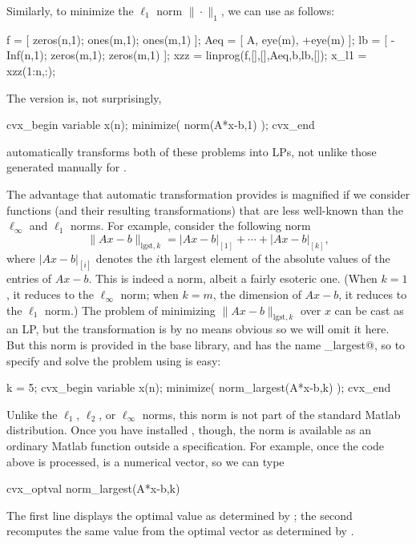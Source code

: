 \documentclass[12pt]{article}
\begin{document}
Similarly, to minimize the $\ell_1$ norm $\|\cdot\|_1$, we can
use \verb@linprog@ as follows:
\begin{code2}[firstnumber=139]
	f    = [ zeros(n,1); ones(m,1);  ones(m,1)  ];
	Aeq  = [ A,          eye(m),     +eye(m)    ];
	lb   = [ -Inf(n,1);  zeros(m,1); zeros(m,1) ];
	xzz  = linprog(f,[],[],Aeq,b,lb,[]);
	x_l1 = xzz(1:n,:);
\end{code2}
The \cvx version is, not surprisingly,
\begin{code2}[firstnumber=149]
	cvx_begin
	    variable x(n);
	    minimize( norm(A*x-b,1) );
	cvx_end
\end{code2}
\cvx automatically transforms both of these problems into LPs, not unlike
those generated manually for \verb@linprog@.

The advantage that automatic transformation provides
is magnified if we consider
functions (and their resulting transformations) that are less well-known than 
the $\ell_\infty$ and $\ell_1$ norms. For example, consider
the following norm
\[
\| Ax-b\|_{\mathrm{lgst},k} = |Ax-b|_{[1]}+ \cdots + |Ax-b|_{[k]},
\]
where $|Ax-b|_{[i]}$ denotes the $i$th largest element of the absolute
values of the entries of $Ax-b$.
This is indeed a norm, albeit a fairly esoteric one.
(When $k=1$, it reduces to the $\ell_\infty$ norm;
when $k=m$, the dimension of $Ax-b$, it reduces to the $\ell_1$ norm.)
The problem of minimizing $\| Ax-b\|_{\mathrm{lgst},k}$ over $x$
can be cast as an LP, but the transformation is by no means obvious
so we will omit it here.
But this norm is provided in the base \cvx library, and has the name
\verb@norm_largest@, so to specify and solve
the problem using \cvx is easy:
\begin{code2}[firstnumber=179]
	k = 5;
	cvx_begin
	    variable x(n);
	    minimize( norm_largest(A*x-b,k) );
	cvx_end
\end{code2}
Unlike the $\ell_1$, $\ell_2$, or $\ell_\infty$ norms,
this norm is not part of the standard Matlab distribution.
Once you have installed \cvx, though, the norm is available as 
an ordinary Matlab function outside a \cvx specification.
For example, once the code above is processed, \verb@x@ is
a numerical vector, so we can type
\begin{code}
	cvx_optval
	norm_largest(A*x-b,k)
\end{code}
The first line displays the optimal value as determined by \cvx;
the second recomputes the same value from the optimal
vector \verb@x@ as determined by \cvx.
\end{document}
